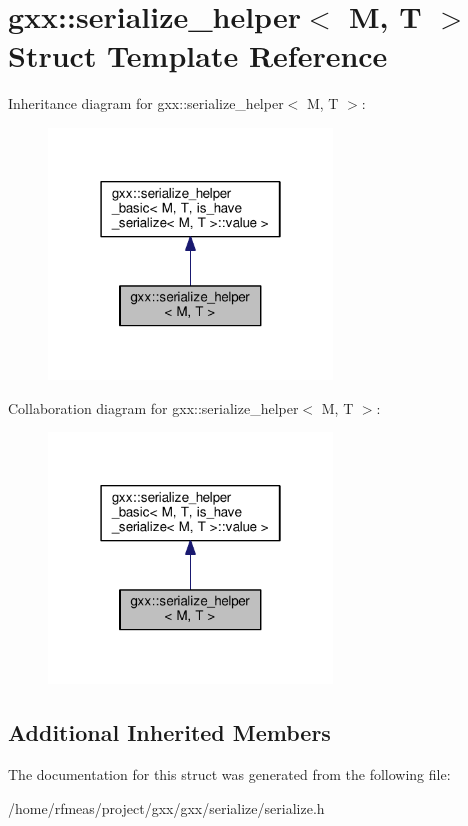 \hypertarget{structgxx_1_1serialize__helper}{}\section{gxx\+:\+:serialize\+\_\+helper$<$ M, T $>$ Struct Template Reference}
\label{structgxx_1_1serialize__helper}


Inheritance diagram for gxx\+:\+:serialize\+\_\+helper$<$ M, T $>$\+:
\nopagebreak
\begin{figure}[H]
\begin{center}
\leavevmode
\includegraphics[width=214pt]{structgxx_1_1serialize__helper__inherit__graph}
\end{center}
\end{figure}


Collaboration diagram for gxx\+:\+:serialize\+\_\+helper$<$ M, T $>$\+:
\nopagebreak
\begin{figure}[H]
\begin{center}
\leavevmode
\includegraphics[width=214pt]{structgxx_1_1serialize__helper__coll__graph}
\end{center}
\end{figure}
\subsection*{Additional Inherited Members}


The documentation for this struct was generated from the following file\+:\begin{DoxyCompactItemize}
\item 
/home/rfmeas/project/gxx/gxx/serialize/serialize.\+h\end{DoxyCompactItemize}
